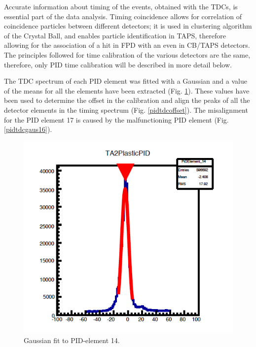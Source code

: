 \indent Accurate information about timing of the events, obtained with the TDCs, is essential part of the data analysis. Timing coincidence allows for correlation of coincidence particles between different detectors; it is used in clustering algorithm of the Crystal Ball, and enables particle identification in TAPS, therefore allowing for the association of a hit in FPD with an even in CB/TAPS detectors. The principles followed for time calibration of the various detectors are the same, therefore, only PID time calibration will be described in more detail below.

\indent The TDC spectrum of each PID element was fitted with a Gaussian and a value of the means for all the elements have been extracted (Fig. \ref{pidtdcgaus}). These values have been used to determine the offset in the calibration and align the peaks of all the detector elements in the timing spectrum (Fig. \ref{pidtdcoffset}). The misalignment for the PID element 17 is caused by the malfunctioning PID element (Fig. \ref{pidtdcgaus16}).

\begin{figure}[H]
\begin{center}
\includegraphics[scale=0.4]{pictures/png/pidtdcgaus.png}
\caption{Gaussian fit to PID-element 14.}
\label{pidtdcgaus}
\end{center}
\end{figure}

